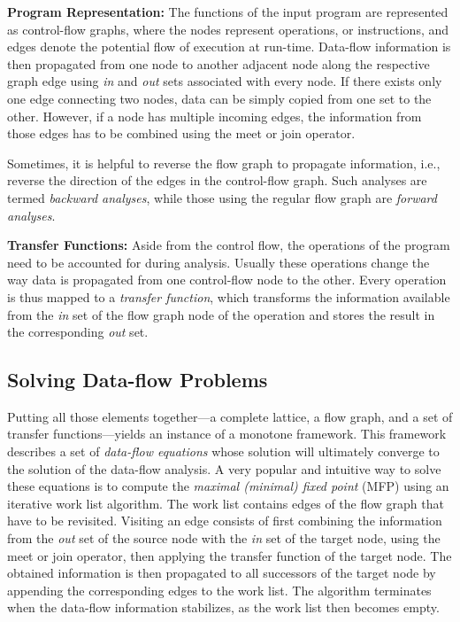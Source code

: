 \textbf{Program Representation:}
The functions of the input program are represented as control-flow graphs, where the nodes represent operations, or instructions, and edges denote the potential flow of execution at run-time. 
Data-flow information is then propagated from one node to another adjacent node along the respective graph edge using \emph{in} and \emph{out} sets associated with every node. If there exists only one edge connecting two nodes, data can be simply copied from one set to the other. 
However, if a node has multiple incoming edges, the information from those edges has to be combined using the meet or join operator.

Sometimes, it is helpful to reverse the flow graph to propagate information, i.e., reverse the direction of the edges in the control-flow graph. 
Such analyses are termed \emph{backward analyses}, while those using the regular flow graph are \emph{forward analyses}.

\textbf{Transfer Functions:}
Aside from the control flow, the operations of the program need to be accounted for during analysis. 
Usually these operations change the way data is propagated from one control-flow node to the other. 
Every operation is thus mapped to a \emph{transfer function}, which transforms the information available from the \emph{in} set of the flow graph node of the operation and stores the result in the corresponding \emph{out} set.

\subsection{Solving Data-flow Problems}
Putting all those elements together---a complete lattice, a flow graph, and a set of transfer functions---yields an instance of a monotone framework. 
This framework describes a set of \emph{data-flow equations} whose solution will ultimately converge to the solution of the data-flow analysis. 
A very popular and intuitive way to solve these equations is to compute the \emph{maximal (minimal) fixed point} (MFP) using an iterative work list algorithm. 
The work list contains edges of the flow graph that have to be revisited. 
Visiting an edge consists of first combining the information from the \emph{out} set of the source node with the \emph{in} set of the target node, using the meet or join operator, then applying the transfer function of the target node. 
The obtained information is then propagated to all successors of the target node by appending the corresponding edges to the work list. 
The algorithm terminates when the data-flow information stabilizes, as the work list then becomes empty.

